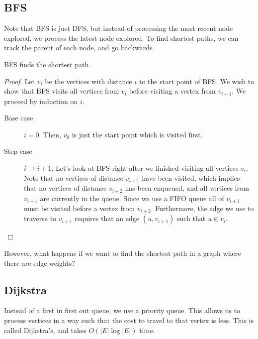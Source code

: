
\subsection{BFS}

Note that BFS is just DFS, but instead of processing the most recent node explored, we process the latest node explored. To find shortest paths, we can track the parent of each node, and go backwards.

\begin{theorem}
	BFS finds the shortest path.
\end{theorem}
\begin{proof}
	Let \( v_i \) be the vertices with distance \( i \) to the start point of BFS. We wish to show that BFS visits all vertices from \( v_i \) before visiting a vertex from \( v_{i+1} \). We proceed by induction on \( i \).
	\begin{description}
		\item[Base case] \( i=0 \). Then, \( v_0 \) is just the start point which is visited first.
		\item[Step case] \( i \to i + 1\). Let's look at BFS right after we finished visiting all vertices \( v_i \). Note that no vertices of distance \( v_{i+1} \) have been visited, which implies that no vertices of distance \( v_{i+2} \) has been enqueued, and all vertices from \( v_{i+1} \) are currently in the queue. Since we use a FIFO queue all of \( v_{i+1} \) must be visited before a vertex from \( v_{i+2} \). Furthermore, the edge we use to traverse to \( v_{i+1} \) requires that an edge \( (u, v_{i+1}) \) such that \( u \in v_i \).
	\end{description}
\end{proof}

However, what happens if we want to find the shortest path in a graph where there are edge weights?

\subsection{Dijkstra}
Instead of a first in first out queue, we use a priority queue. This allows us to process vertices in a way such that the cost to travel to that vertex is less. This is called Dijkstra's, and takes \( O(|E|\log |E|) \) time.

